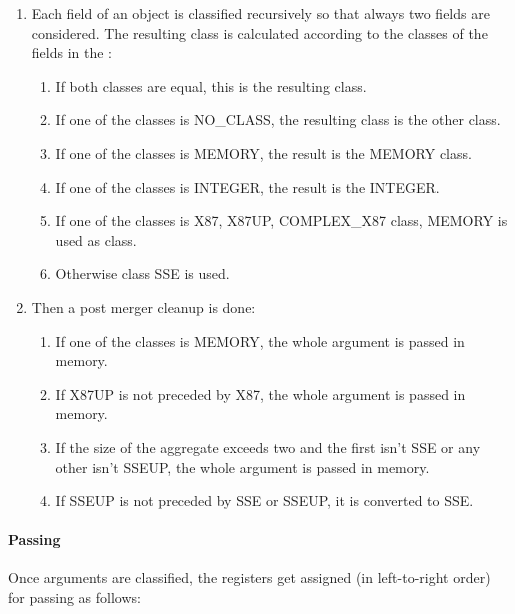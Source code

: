 \begin{enumerate}
\item Each field of an object is classified recursively so that always
   two fields are considered.  The resulting class is calculated
   according to the classes of the fields in the \eightbyte:
   \begin{enumerate}
   \item
      If both classes are equal, this is the resulting class.
   \item If one of the classes is NO_CLASS, the resulting class is the other class.
   \item If one of the classes is MEMORY, the result is the MEMORY class.
   \item If one of the classes is INTEGER, the result is the INTEGER.
   \item If one of the classes is X87, X87UP, COMPLEX\_X87 class,
     MEMORY is used as class.
   \item Otherwise class SSE is used.
   \end{enumerate}
\item Then a post merger cleanup is done:
  \begin{enumerate}
  \item If one of the classes is MEMORY, the whole argument is passed in memory.
  \item If X87UP is not preceded by X87, the whole argument is passed in
    memory.
  \item If the size of the aggregate exceeds two \eightbytes and the first
    \eightbyte isn't SSE or any other \eightbyte isn't SSEUP, the whole
    argument is passed in memory.
  \item If SSEUP is not preceded by SSE or SSEUP, it is converted to SSE.
  \end{enumerate}
\end{enumerate}

\paragraph{Passing}
Once arguments are classified, the registers get assigned (in
left-to-right order) for passing as follows:

